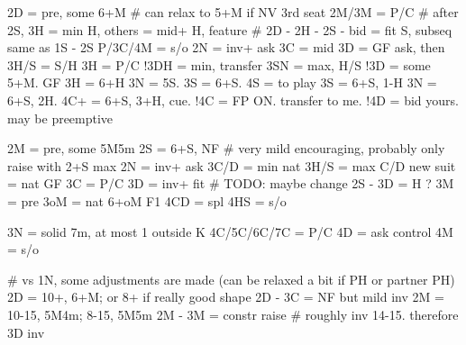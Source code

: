 2D = pre, some 6+M  # can relax to 5+M if NV 3rd seat
    2M/3M = P/C 
        # after 2S, 3H = min H, others = mid+ H, feature
        # 2D - 2H - 2S - bid = fit S, subseq same as 1S - 2S
    P/3C/4M = s/o
    2N = inv+ ask
        3C = mid
            3D = GF ask, then 3H/S = S/H
            3H = P/C
        !3DH = min, transfer
        3SN = max, H/S
    !3D = some 5+M. GF
        3H = 6+H
            3N = 5S. 3S = 6+S. 4S = to play
        3S = 6+S, 1-H
        3N = 6+S, 2H.
        4C+ = 6+S, 3+H, cue.
    !4C = FP ON. transfer to me.
    !4D = bid yours. may be preemptive

2M = pre, some 5M5m
    2S = 6+S, NF  # very mild encouraging, probably only raise with 2+S max
    2N = inv+ ask
        3C/D = min nat
        3H/S = max C/D
            new suit = nat GF
    3C = P/C
    3D = inv+ fit  # TODO: maybe change 2S - 3D = H ?
    3M = pre
    3oM = nat 6+oM F1
    4CD = spl
    4HS = s/o

3N = solid 7m, at most 1 outside K
    4C/5C/6C/7C = P/C
    4D = ask control
    4M = s/o

# vs 1N, some adjustments are made (can be relaxed a bit if PH or partner PH)
2D = 10+, 6+M; or 8+ if really good shape
2D - 3C = NF but mild inv
2M = 10-15, 5M4m; 8-15, 5M5m
2M - 3M = constr raise  # roughly inv 14-15. therefore 3D inv